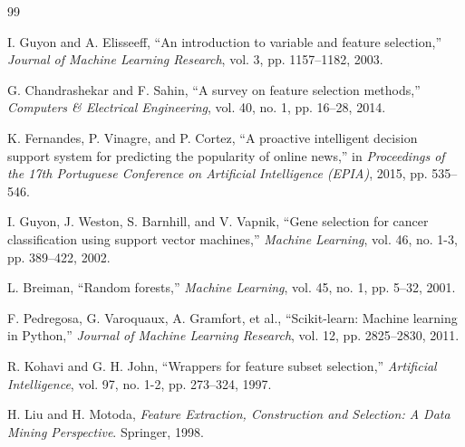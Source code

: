 \documentclass[conference]{IEEEtran}
\begin{document}
\begin{thebibliography}{99}

I. Guyon and A. Elisseeff, ``An introduction to variable and feature selection,'' \textit{Journal of Machine Learning Research}, vol. 3, pp. 1157--1182, 2003.

G. Chandrashekar and F. Sahin, ``A survey on feature selection methods,'' \textit{Computers \& Electrical Engineering}, vol. 40, no. 1, pp. 16--28, 2014.

K. Fernandes, P. Vinagre, and P. Cortez, ``A proactive intelligent decision support system for predicting the popularity of online news,'' in \textit{Proceedings of the 17th Portuguese Conference on Artificial Intelligence (EPIA)}, 2015, pp. 535--546.

I. Guyon, J. Weston, S. Barnhill, and V. Vapnik, ``Gene selection for cancer classification using support vector machines,'' \textit{Machine Learning}, vol. 46, no. 1-3, pp. 389--422, 2002.

L. Breiman, ``Random forests,'' \textit{Machine Learning}, vol. 45, no. 1, pp. 5--32, 2001.

F. Pedregosa, G. Varoquaux, A. Gramfort, et al., ``Scikit-learn: Machine learning in Python,'' \textit{Journal of Machine Learning Research}, vol. 12, pp. 2825--2830, 2011.

R. Kohavi and G. H. John, ``Wrappers for feature subset selection,'' \textit{Artificial Intelligence}, vol. 97, no. 1-2, pp. 273--324, 1997.

H. Liu and H. Motoda, \textit{Feature Extraction, Construction and Selection: A Data Mining Perspective}. Springer, 1998.

\end{thebibliography}
\end{document}
